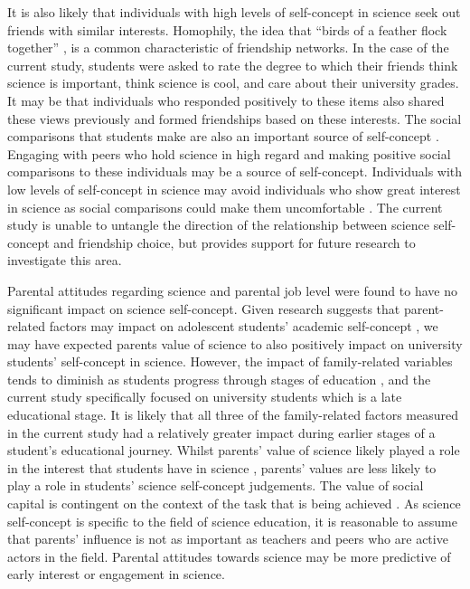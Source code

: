 It is also likely that individuals with high levels of self-concept in science seek out friends with similar interests. Homophily, the idea that ``birds of a feather flock together'' \citep{mcpherson2001birds}, is a common characteristic of friendship networks. In the case of the current study, students were asked to rate the degree to which their friends think science is important, think science is cool, and care about their university grades. It may be that individuals who responded positively to these items also shared these views previously and formed friendships based on these interests. The social comparisons that students make are also an important source of self-concept \citep{butz2015salient}. Engaging with peers who hold science in high regard and making positive social comparisons to these individuals may be a source of self-concept. Individuals with low levels of self-concept in science may avoid individuals who show great interest in science as social comparisons could make them uncomfortable \citep{bong1999comparison}. The current study is unable to untangle the direction of the relationship between science self-concept and friendship choice, but provides support for future research to investigate this area.   

Parental attitudes regarding science and parental job level were found to have no significant impact on science self-concept. Given research suggests that parent-related factors may impact on adolescent students' academic self-concept \citep{fan2010effects}, we may have expected parents value of science to also positively impact on university students' self-concept in science. However, the impact of family-related variables tends to diminish as students progress through stages of education \citep{holm2011dealing}, and the current study specifically focused on university students which is a late educational stage. It is likely that all three of the family-related factors measured in the current study had a relatively greater impact during earlier stages of a student's educational journey. Whilst parents' value of science likely played a role in the interest that students have in science \citep{archer2013aspires}, parents' values are less likely to play a role in students' science self-concept judgements. The value of social capital is contingent on the context of the task that is being achieved \citep{Adler2017}. As science self-concept is specific to the field of science education, it is reasonable to assume that parents' influence is not as important as teachers and peers who are active actors in the field. Parental attitudes towards science may be more predictive of early interest or engagement in science.  


